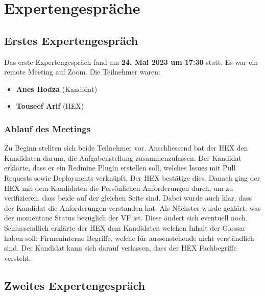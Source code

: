 \chapter{Expertengespräche}
\section{Erstes Expertengespräch}
\label{sec:first-expert-meeting}
Das erste Expertengespräch fand am \textbf{24. Mai 2023 um 17:30} statt. Es war ein remote Meeting auf Zoom.
Die Teilnehmer waren:
\begin{itemize}
  \item \textbf{Anes Hodza} (Kandidat)
  \item \textbf{Touseef Arif} (HEX)
\end{itemize}

\subsection{Ablauf des Meetings}
Zu Beginn stellten sich beide Teilnehmer vor. Anschliessend bat der HEX den Kandidaten darum, die Aufgabenstellung
zusammenzufassen. Der Kandidat erklärte, dass er ein Redmine Plugin erstellen soll, welches \gls{Issue}s mit Pull Requests
sowie Deployments verknüpft. Der HEX bestätige dies. \newline
Danach ging der HEX mit dem Kandidaten die Persönlichen Anforderungen durch, um zu verifizieren, dass beide auf der
gleichen Seite sind. Dabei wurde auch klar, dass der Kandidat die Anforderungen verstanden hat. \newline
Als Nächstes wurde geklärt, was der momentane Status bezüglich der VF ist. Diese ändert sich eventuell noch. \newline
Schlussendlich erklärte der HEX dem Kandidaten welchen Inhalt der Glossar haben soll: Firmeninterne Begriffe, welche
für aussenstehende nicht verständlich sind. Der Kandidat kann sich darauf verlassen, dass der HEX Fachbegriffe
versteht. \newline

\section{Zweites Expertengespräch}
